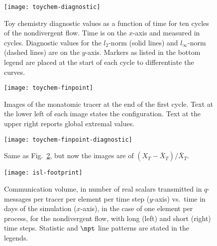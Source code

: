 \begin{figure}[tbh]
  \centering
  \texttt{[image: toychem-diagnostic]}
  \caption{
    Toy chemistry diagnostic values as a function of time for ten cycles of the nondivergent flow.
    Time is on the $x$-axis and measured in cycles.
    Diagnostic values for the $l_2$-norm (solid lines) and $l_\infty$-norm (dashed lines) are on the $y$-axis.
    Markers as listed in the bottom legend are placed at the start of each cycle to differentiate the curves.
  }
  \label{fig:toychem-diagnostic}
\end{figure}

\begin{figure}[tbh]
  \centering
  \texttt{[image: toychem-finpoint]}
  \caption{
    Images of the monatomic tracer at the end of the first cycle.
    Text at the lower left of each image states the configuration.
    Text at the upper right reports global extremal values.
  }
  \label{fig:toychem-finpoint}
\end{figure}
\begin{figure}[tbh]
  \centering
  \texttt{[image: toychem-finpoint-diagnostic]}
  \caption{
    Same as Fig.~\ref{fig:toychem-finpoint}, but now the images are of $(X_T - \bar{X}_T)/\bar{X}_T$.
  }
  \label{fig:toychem-finpoint-diagnostic}
\end{figure}

\begin{figure}[tbh]
  \centering
  \texttt{[image: isl-footprint]}
  \caption{
    Communication volume, in number of real scalars transmitted in $q$-messages
    per tracer per element per time step ($y$-axis)
    vs.~time in days of the simulation ($x$-axis),
    in the case of one element per process,
    for the nondivergent flow,
    with long (left) and short (right) time steps.
    Statistic and $\npt$ line patterns are stated in the legends.
  }
  \label{fig:footprint}
\end{figure}

